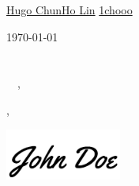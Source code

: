 \documentclass[12pt]{letter}
\begin{document}
\AddToShipoutPictureBG{%
\color{gr}
\AtPageUpperLeft{\rule[-1.3in]{\paperwidth}{1.3in}}
}

\begin{center}
{\fontsize{28}{0}\selectfont\scshape \myname}

\href{mailto:\myemail}{\faEnvelope\enspace \myemail}\hfill
\href{https://www.linkedin.com/in/1chooo/}{\faLinkedinIn\enspace Hugo ChunHo Lin}\hfill
\href{tel:\myphone}{\faPhone\enspace \myphone}\hfill
\href{https://github.com/1chooo}{\faGithub\enspace 1chooo}
\end{center}


\vspace{0.2in}

\today\\

\vspace{-0.1in}\recipient\\
\company\\

\vspace{-0.1in}\greeting\ \recipient\ \commited,\\

\vspace{-0.1in}\setlength\parindent{24pt}
\noindent

\vspace{0.1in}
\vfill

\begin{flushright}
\closer,

\vspace{-0.1in}\includegraphics[width=1.5in]{sig.png}\vspace{-0.1in}

\myname\\
\mytitle
\end{flushright}

% 
\end{document}
